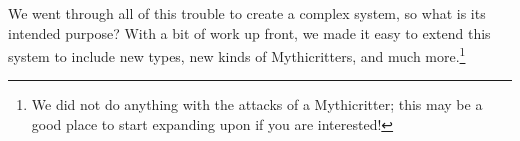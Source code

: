 We went through all of this trouble to create a complex system, so what is its intended purpose? With a bit of work up front, we made it easy to extend this system to include new types, new kinds of Mythicritters, and much more.\footnote{We did not do anything with the attacks of a Mythicritter; this may be a good place to start expanding upon if you are interested!}